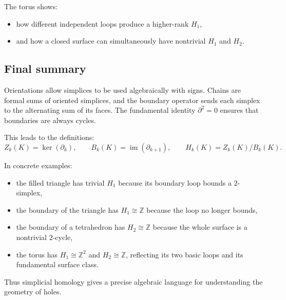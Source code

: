 \documentclass[12pt,a4paper]{article}
\theoremstyle{notespace}
\begin{document}
The torus shows:
\begin{itemize}
	\item how different independent loops produce a higher-rank \(H_1\),
	\item and how a closed surface can simultaneously have nontrivial \(H_1\) and \(H_2\).
\end{itemize}

\subsection{Final summary}

Orientations allow simplices to be used algebraically with signs. Chains are formal sums of oriented simplices, and the boundary operator sends each simplex to the alternating sum of its faces. The fundamental identity \(\partial^2=0\) ensures that boundaries are always cycles.

This leads to the definitions:
\[
Z_k(K)=\ker(\partial_k),
\qquad
B_k(K)=\operatorname{im}(\partial_{k+1}),
\qquad
H_k(K)=Z_k(K)/B_k(K).
\]

In concrete examples:
\begin{itemize}
	\item the filled triangle has trivial \(H_1\) because its boundary loop bounds a \(2\)-simplex,
	\item the boundary of the triangle has \(H_1\cong \mathbb{Z}\) because the loop no longer bounds,
	\item the boundary of a tetrahedron has \(H_2\cong \mathbb{Z}\) because the whole surface is a nontrivial \(2\)-cycle,
	\item the torus has \(H_1\cong \mathbb{Z}^2\) and \(H_2\cong \mathbb{Z}\), reflecting its two basic loops and its fundamental surface class.
\end{itemize}

Thus simplicial homology gives a precise algebraic language for understanding the geometry of holes.
\end{document}
